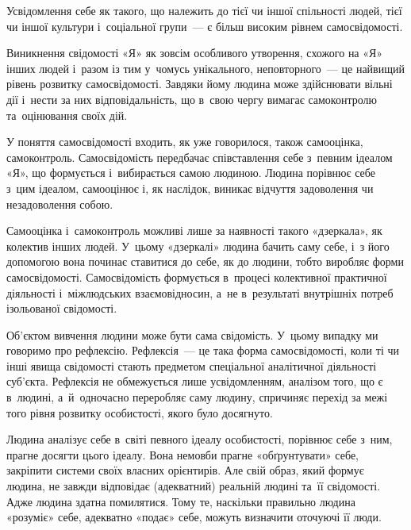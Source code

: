 \documentclass[a5paper,oneside,DIV=12,12pt,headings=small]{scrartcl}
\begin{document}
		Усвідомлення себе як такого, що належить до тієї чи іншої спільності людей, тієї чи іншої культури і~соціальної групи~— є більш високим рівнем самосвідомості.

		Виникнення свідомості «Я» як зовсім особливого утворення, схожого на «Я» інших людей і~разом із тим у~чомусь унікального, неповторного~— це найвищий рівень розвитку самосвідомості. Завдяки йому людина може здійснювати вільні дії і~нести за них відповідальність, що в~свою чергу вимагає самоконтролю та~оцінювання своїх дій.

		У поняття самосвідомості входить, як уже говорилося, також самооцінка, самоконтроль. Самосвідомість передбачає співставлення себе з~певним ідеалом «Я», що формується і~вибирається самою людиною. Людина порівнює себе з~цим ідеалом, самооцінює і, як наслідок, виникає відчуття задоволення чи незадоволення собою.

		Самооцінка і~самоконтроль можливі лише за наявності такого «дзеркала», як колектив інших людей. У~цьому «дзеркалі» людина бачить саму себе, і~з його допомогою вона починає ставитися до себе, як до людини, тобто виробляє форми самосвідомості. Самосвідомість формується в~процесі колективної практичної діяльності і~міжлюдських взаємовідносин, а~не в~результаті внутрішніх потреб ізольованої свідомості.

		Об'\-єк\-том вивчення людини може бути сама свідомість. У~цьому випадку ми говоримо про рефлексію. Рефлексія~— це така форма самосвідомості, коли ті чи інші явища свідомості стають предметом спеціальної аналітичної діяльності суб'\-єкта. Рефлексія не обмежується лише усвідомленням, аналізом того, що є в~людині, а~й~одночасно переробляє саму людину, спричиняє перехід за межі того рівня розвитку особистості, якого було досягнуто.

		Людина аналізує себе в~світі певного ідеалу особистості, порівнює себе з~ним, прагне досягти цього ідеалу. Вона немовби прагне «обґрунтувати» себе, закріпити системи своїх власних орієнтирів. Але свій образ, який формує людина, не завжди відповідає (адекватний) реальній людині та~її свідомості. Адже людина здатна помилятися. Тому те, наскільки правильно людина «розуміє» себе, адекватно «подає» себе, можуть визначити оточуючі її люди.

\end{document}
